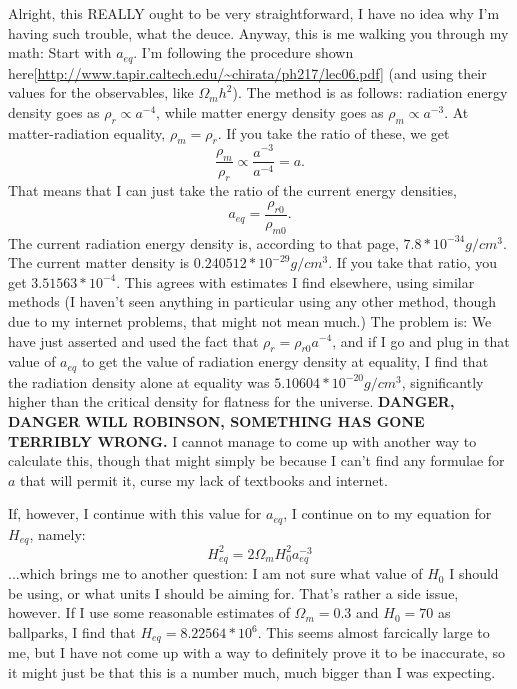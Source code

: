 \documentclass[preprint,aps]{revtex4}
\begin{document}
Alright, this REALLY ought to be very straightforward, I have no idea why I'm having such trouble, what the deuce. Anyway, this is me walking you through my math:
Start with $a_{eq}$. I'm following the procedure shown here[\url{http://www.tapir.caltech.edu/~chirata/ph217/lec06.pdf}] (and using their values for the observables, like $\Omega_mh^2$). The method is as follows: radiation energy density goes as $\rho_r \propto a^{-4}$, while matter energy density goes as $\rho_m \propto a^{-3}$. At matter-radiation equality, $\rho_m=\rho_r$. If you take the ratio of these, we get 
\begin{equation}
\frac{\rho_m}{\rho_r}\propto\frac{a^{-3}}{a^{-4}}=a.
\end{equation}
That means that I can just take the ratio of the current energy densities, 
\begin{equation}
a_{eq}=\frac{\rho_{r0}}{\rho_{m0}}.
\end{equation}
The current radiation energy density is, according to that page, $7.8*10^{-34}g/cm^3$. The current matter density is $0.240512*10^{-29}g/cm^3$. If you take that ratio, you get $3.51563*10^{-4}$. This agrees with estimates I find elsewhere, using similar methods (I haven't seen anything in particular using any other method, though due to my internet problems, that might not mean much.) The problem is: We have just asserted and used the fact that $\rho_r=\rho_{r0}a^{-4}$, and if I go and plug in that value of $a_{eq}$ to get the value of radiation energy density at equality, I find that the radiation density alone at equality was $5.10604*10^{-20}g/cm^3$, significantly higher than the critical density for flatness for the universe. \textbf{DANGER, DANGER WILL ROBINSON, SOMETHING HAS GONE TERRIBLY WRONG.} I cannot manage to come up with another way to calculate this, though that might simply be because I can't find any formulae for $a$ that will permit it, curse my lack of textbooks and internet. 

If, however, I continue with this value for $a_{eq}$, I continue on to my equation for $H_{eq}$, namely: 
\begin{equation}
H_{eq}^2=2\Omega_m H_0^2 a_{eq}^{-3}
\end{equation}
...which brings me to another question: I am not sure what value of $H_0$ I should be using, or what units I should be aiming for. That's rather a side issue, however. If I use some reasonable estimates of $\Omega_m=0.3$ and $H_0=70$ as ballparks, I find that $H_{eq}=8.22564*10^6$. This seems almost farcically large to me, but I have not come up with a way to definitely prove it to be inaccurate, so it might just be that this is a number much, much bigger than I was expecting. 
\end{document}
